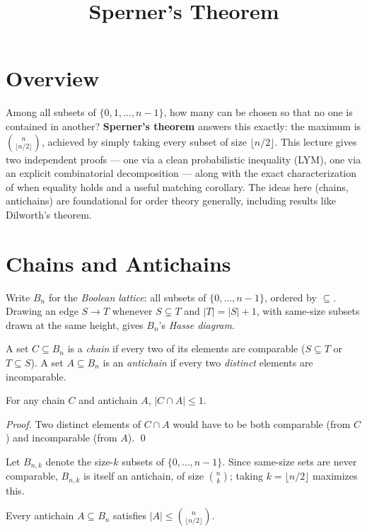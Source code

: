 \documentclass[11pt]{article}
\title{Sperner's Theorem}
\author{}
\date{}
\begin{document}
\thispagestyle{fancy}


\section{Overview}
Among all subsets of $\{0, 1, \ldots, n-1\}$, how many can be chosen so
that no one is contained in another? \textbf{Sperner's theorem} answers
this exactly: the maximum is $\binom{n}{\lfloor n/2 \rfloor}$, achieved by
simply taking every subset of size $\lfloor n/2 \rfloor$. This lecture
gives two independent proofs --- one via a clean probabilistic inequality
(LYM), one via an explicit combinatorial decomposition --- along with the
exact characterization of when equality holds and a useful matching
corollary. The ideas here (chains, antichains) are foundational for order
theory generally, including results like Dilworth's theorem.

\section{Chains and Antichains}
Write $B_n$ for the \emph{Boolean lattice}: all subsets of
$\{0,\ldots,n-1\}$, ordered by $\subseteq$. Drawing an edge $S \to T$
whenever $S \subsetneq T$ and $|T|=|S|+1$, with same-size subsets drawn at
the same height, gives $B_n$'s \emph{Hasse diagram}.

\begin{definitionbox}
A set $C \subseteq B_n$ is a \emph{chain} if every two of its elements are
comparable ($S \subseteq T$ or $T \subseteq S$). A set $A \subseteq B_n$
is an \emph{antichain} if every two \emph{distinct} elements are
incomparable.
\end{definitionbox}

\begin{theorembox}
For any chain $C$ and antichain $A$, $|C \cap A| \le 1$.

\emph{Proof.} Two distinct elements of $C \cap A$ would have to be both
comparable (from $C$) and incomparable (from $A$). \qed
\end{theorembox}

Let $B_{n,k}$ denote the size-$k$ subsets of $\{0,\ldots,n-1\}$. Since
same-size sets are never comparable, $B_{n,k}$ is itself an antichain, of
size $\binom{n}{k}$; taking $k = \lfloor n/2 \rfloor$ maximizes this.

\begin{theorembox}[(Sperner)]
Every antichain $A \subseteq B_n$ satisfies
$|A| \le \binom{n}{\lfloor n/2 \rfloor}$.
\end{theorembox}
\end{document}
